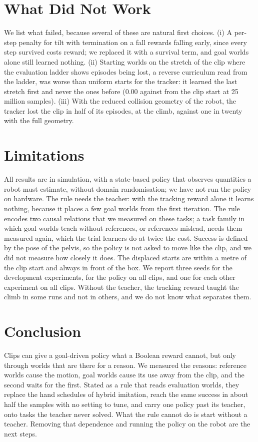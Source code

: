 

\section{What Did Not Work}

We list what failed, because several of these are natural first choices. (i) A per-step penalty for tilt with termination on a fall rewards falling early, since every step survived costs reward; we replaced it with a survival term, and goal worlds alone still learned nothing. (ii) Starting worlds on the stretch of the clip where the evaluation ladder shows episodes being lost, a reverse curriculum read from the ladder, was worse than uniform starts for the tracker: it learned the last stretch first and never the ones before (0.00 against \lossStarts{} from the clip start at 25 million samples). (iii) With the reduced collision geometry of the robot, the tracker lost the clip in half of its episodes, at the climb, against one in twenty with the full geometry.

\section{Limitations}
\label{sec:limits}

All results are in simulation, with a state-based policy that observes quantities a robot must estimate, without domain randomisation; we have not run the policy on hardware. The rule needs the teacher: with the tracking reward alone it learns nothing, because it places a few goal worlds from the first iteration. The rule encodes two causal relations that we measured on these tasks; a task family in which goal worlds teach without references, or references mislead, needs them measured again, which the trial learners do at twice the cost. Success is defined by the pose of the pelvis, so the policy is not asked to move like the clip, and we did not measure how closely it does. The displaced starts are within a metre of the clip start and always in front of the box. We report three seeds for the development experiments, \seedsAll{} for the policy on all clips, and one for each other experiment on all clips. Without the teacher, the tracking reward taught the climb in some runs and not in others, and we do not know what separates them.

\section{Conclusion}

Clips can give a goal-driven policy what a Boolean reward cannot, but only through worlds that are there for a reason. We measured the reasons: reference worlds cause the motion, goal worlds cause its use away from the clip, and the second waits for the first. Stated as a rule that reads evaluation worlds, they replace the hand schedules of hybrid imitation, reach the same success in about half the samples with no setting to tune, and carry one policy past its teacher, onto tasks the teacher never solved. What the rule cannot do is start without a teacher. Removing that dependence and running the policy on the robot are the next steps.
